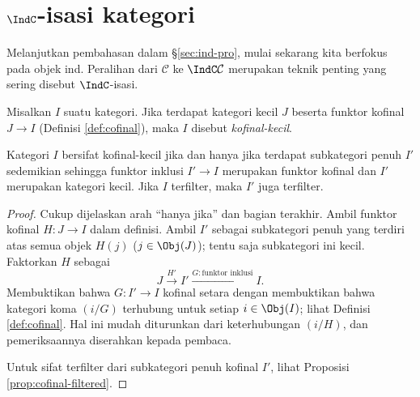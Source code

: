 \section{\texorpdfstring{$\IndC$}{Ind}-isasi kategori}\label{sec:Indization}
Melanjutkan pembahasan dalam \S\ref{sec:ind-pro}, mulai sekarang kita berfokus pada objek ind. Peralihan dari $\mathcal{C}$ ke $\IndC\mathcal{C}$ merupakan teknik penting yang sering disebut $\IndC$-isasi.

\begin{definition}
	Misalkan $I$ suatu kategori. Jika terdapat kategori kecil $J$ beserta funktor kofinal $J \to I$ (Definisi \ref{def:cofinal}), maka $I$ disebut \emph{kofinal-kecil}.
\end{definition}

\begin{lemma}\label{prop:cofinally-small-sub}
	Kategori $I$ bersifat kofinal-kecil jika dan hanya jika terdapat subkategori penuh $I'$ sedemikian sehingga funktor inklusi $I' \to I$ merupakan funktor kofinal dan $I'$ merupakan kategori kecil. Jika $I$ terfilter, maka $I'$ juga terfilter.
\end{lemma}
\begin{proof}
	Cukup dijelaskan arah ``hanya jika'' dan bagian terakhir. Ambil funktor kofinal $H: J \to I$ dalam definisi. Ambil $I'$ sebagai subkategori penuh yang terdiri atas semua objek $H(j)$ ($j \in \Obj(J)$); tentu saja subkategori ini kecil. Faktorkan $H$ sebagai
	\[ J \xrightarrow{H'} I' \xrightarrow{G: \text{funktor inklusi}} I. \]
	Membuktikan bahwa $G: I' \to I$ kofinal setara dengan membuktikan bahwa kategori koma $(i/G)$ terhubung untuk setiap $i \in \Obj(I)$; lihat Definisi \ref{def:cofinal}. Hal ini mudah diturunkan dari keterhubungan $(i/H)$, dan pemeriksaannya diserahkan kepada pembaca.
	
	Untuk sifat terfilter dari subkategori penuh kofinal $I'$, lihat Proposisi \ref{prop:cofinal-filtered}.
\end{proof}

